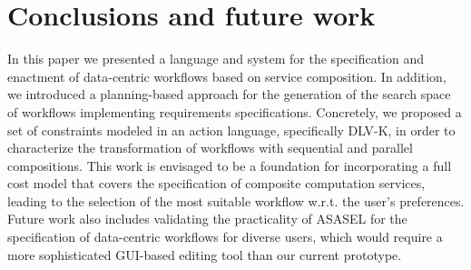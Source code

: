 
\section{Conclusions and future work} \label{sec:conclusions}

In this paper we presented a language and system for the specification and enactment of data-centric workflows based on service composition. In addition, we introduced a planning-based approach for the generation of the search space of workflows implementing requirements specifications. Concretely, we proposed a set of constraints modeled in an action language, specifically DLV-K, in order to characterize the transformation of workflows with sequential and parallel compositions. This work is envisaged to be a foundation for incorporating a full cost model that covers the specification of composite computation services, leading to the selection of the most suitable workflow w.r.t. the user's preferences. Future work also includes validating the practicality of ASASEL for the specification of data-centric workflows for diverse users, which would require a more sophisticated GUI-based editing tool than our current prototype. 

